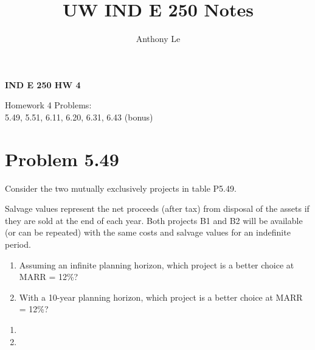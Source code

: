 \documentclass[../INDE250HW.tex]{subfiles}
\title{UW IND E 250 Notes}
\author{Anthony Le}
\begin{document}
\pagestyle{fancy}
\fancyhead{}

\begin{center}
    \LARGE{\textbf{IND E 250 HW 4}}
\end{center}
\begin{center}
    Homework 4 Problems: \\
    5.49, 5.51, 6.11, 6.20, 6.31, 6.43 (bonus)
\end{center}

\section*{Problem 5.49}
\begin{exmp}
    Consider the two mutually exclusively projects in table P5.49.

    Salvage values represent the net proceeds (after tax) from disposal of the assets if they are sold at the end of each year. Both projects B1 and B2 will be available (or can be repeated) with the same costs and salvage values for an indefinite period. 
    \begin{enumerate}
        \item Assuming an infinite planning horizon, which project is a better choice at MARR = 12\%?
        \item With a 10-year planning horizon, which project is a better choice at MARR = 12\%?
    \end{enumerate}
\end{exmp}
\begin{enumerate}
    \item {}
    \item {}
\end{enumerate}
\end{document}
